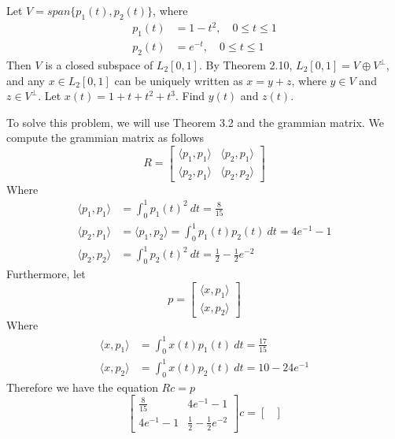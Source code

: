 \documentclass{exam}
\begin{document}
  \begin{problem}
    Let $V = span\{p_1(t), p_2(t)\}$, where
    \[
      \begin{aligned}
        p_1(t) &= 1-t^2, \quad 0 \leq t \leq 1 \\
        p_2(t) &= e^{-t}, \quad 0 \leq t \leq 1
      \end{aligned}
    \]
    Then $V$ is a closed subspace of $L_2[0,1]$. By Theorem 2.10, $L_2[0,1] = V \oplus V^\perp$, and any $x \in L_2[0,1]$ can be uniquely written as $x = y + z$, where $y\in V$ and $z \in V^\perp$. Let $x(t) = 1 + t + t^2 + t^3$. Find $y(t)$ and $z(t)$.
  \end{problem}
  \begin{solution}
    To solve this problem, we will use Theorem 3.2 and the grammian matrix. We compute the grammian matrix as follows
    \[
      R = \begin{bmatrix}
        \langle p_1, p_1 \rangle & \langle p_2, p_1\rangle \\
        \langle p_2, p_1 \rangle & \langle p_2, p_2 \rangle
      \end{bmatrix}
    \]
    Where
    \[
      \begin{aligned}
        \langle p_1, p_1 \rangle &= \int_0^1 p_1(t)^2\ dt =  \frac{8}{15} \\
        \langle p_2, p_1 \rangle &= \langle p_1, p_2 \rangle = \int_0^1 p_1(t)p_2(t)\ dt = 4e^{-1} - 1 \\
        \langle p_2, p_2 \rangle &= \int_0^1 p_2(t)^2\ dt = \frac{1}{2} - \frac{1}{2}e^{-2}
      \end{aligned}
    \]
    Furthermore, let
    \[
      p = \begin{bmatrix}
        \langle x, p_1\rangle \\
        \langle x, p_2\rangle
      \end{bmatrix}
    \]
    Where
    \[
      \begin{aligned}
        \langle x, p_1 \rangle &= \int_0^1 x(t)p_1(t)\ dt = \frac{17}{15} \\
        \langle x, p_2 \rangle &= \int_0^1 x(t)p_2(t)\ dt = 10 - 24e^{-1}
      \end{aligned}
    \]
    Therefore we have the equation $Rc = p$
    \[
      \begin{bmatrix}
        \frac{8}{15} & 4e^{-1} - 1\\
        4e^{-1} - 1 & \frac{1}{2} - \frac{1}{2}e^{-2}
      \end{bmatrix}c =
      \begin{bmatrix}

\end{bmatrix}\]
\end{solution}
\end{document}
